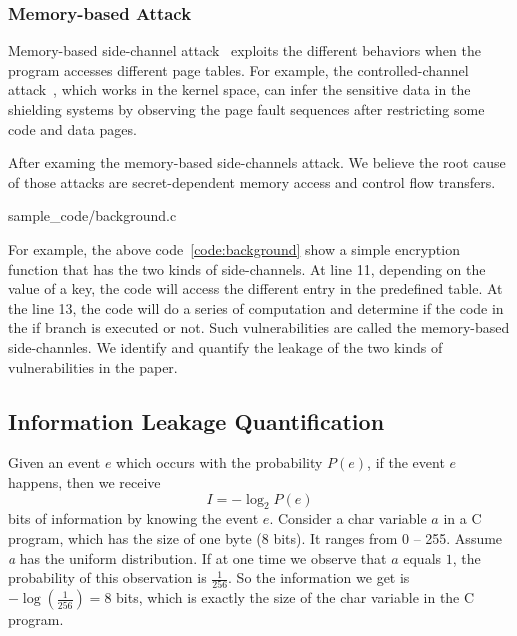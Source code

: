 \subsubsection{Memory-based Attack}
Memory-based side-channel attack~\cite{7163052} exploits the different behaviors when the
program accesses different page tables. For example, the controlled-channel attack~\cite{7163052},
which works in the kernel space, can infer the sensitive data in the shielding systems by
observing the page fault sequences after restricting some code and
data pages. 

After examing the memory-based side-channels attack. We believe the root
cause of those attacks are secret-dependent memory access and control
flow transfers.


                 {sample_code/background.c}

For example, the above code~\ref{code:background} show a simple encryption function that
has the two kinds of side-channels. At line 11, depending on the value of a key,
the code will access the different entry in the predefined table. At the
line 13, the code will do a series of computation and determine if the code in the if
branch is executed or not. Such vulnerabilities are called the memory-based 
side-channles. We identify and quantify the leakage of the two kinds of vulnerabilities 
in the paper.

\subsection{Information Leakage Quantification}
Given an event $e$ which occurs with the probability $P(e)$, if the event $e$ happens, 
then we receive
\begin{displaymath}
    I = - \log_2P(e)
\end{displaymath}
bits of information by knowing the event $e$.
Consider a char variable $a$ in a C program, which has the size
of one byte (8 bits). It ranges from 0 -- 255.  Assume
 \textit{a} has the uniform distribution. If at one time we observe that $a$
equals $1$, the probability of this observation is $\frac{1}{256}$. So the information we get is 
$-\log(\frac{1}{256}) = 8$ bits, which is exactly the size of the char variable in the C program.

